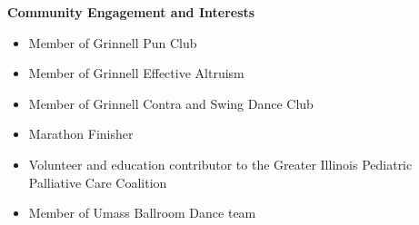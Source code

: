 \documentclass[9pt]{extarticle}
\begin{document}
\begin{large}
\begin{center}\textbf{Community Engagement and Interests}
\end{center}
\end{large}
\begin{itemize}
\item Member of Grinnell Pun Club
\item Member of Grinnell Effective Altruism
\item Member of Grinnell Contra and Swing Dance Club
\item Marathon Finisher
\item Volunteer and education contributor to the Greater Illinois
  Pediatric Palliative Care Coalition
  \item Member of Umass Ballroom Dance team
\end{itemize}
\end{document}
